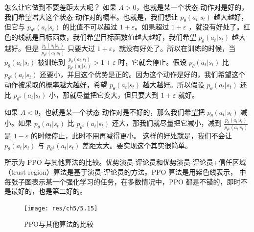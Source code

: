 怎么让它做到不要差距太大呢？
    如果 $A > 0$，也就是某一个状态-动作对是好的，我们希望增大这个状态-动作对的概率。也就是，我们想让  $p_{\theta}(a_{t} | s_{t})$ 越大越好，但它与 $p_{\theta^k}(a_{t} | s_{t})$ 的比值不可以超过 $1+\varepsilon$。如果超过 $1+\varepsilon$  ，就没有好处了。红色的线就是目标函数，我们希望目标函数值越大越好，我们希望 $p_{\theta}(a_{t} | s_{t})$ 越大越好。但是 $\frac{p_{\theta}\left(a_{t} | s_{t}\right)}{p_{\theta^{k}}\left(a_{t} | s_{t}\right)}$ 只要大过 $1+\varepsilon$，就没有好处了。所以在训练的时候，当 $p_{\theta}(a_{t} | s_{t})$ 被训练到 $\frac{p_{\theta}\left(a_{t} | s_{t}\right)}{p_{\theta^{k}}\left(a_{t} | s_{t}\right)}>1+\varepsilon$ 时，它就会停止。假设 $p_{\theta}(a_{t} | s_{t})$  比 $p_{\theta^k}(a_{t} | s_{t})$ 还要小，并且这个优势是正的。因为这个动作是好的，我们希望这个动作被采取的概率越大越好，希望 $p_{\theta}(a_{t} | s_{t})$ 越大越好。所以假设 $p_{\theta}(a_{t} | s_{t})$ 还比 $p_{\theta^k}(a_{t} | s_{t})$  小，那就尽量把它变大，但只要大到 $1+\varepsilon$ 就好。

    如果 $A < 0$，也就是某一个状态-动作对是不好的，那么我们希望把 $p_{\theta}(a_{t} | s_{t})$ 减小。如果 $p_{\theta}(a_{t} | s_{t})$ 比 $p_{\theta^k}(a_{t} | s_{t})$  还大，那我们就尽量把它减小，减到 $\frac{p_{\theta}\left(a_{t} | s_{t}\right)}{p_{\theta^{k}}\left(a_{t} | s_{t}\right)}$ 是 $1-\varepsilon$ 的时候停止，此时不用再减得更小。
这样的好处就是，我们不会让 $p_{\theta}(a_{t} | s_{t})$ 与 $p_{\theta^k}(a_{t} | s_{t})$ 差距太大。要实现这个其实很简单。


 所示为 PPO 与其他算法的比较。优势演员-评论员和优势演员-评论员+信任区域（trust region）算法是基于演员-评论员的方法。PPO 算法是用紫色线表示， 中每张子图表示某一个强化学习的任务，在多数情况中，PPO 都是不错的，即时不是最好的，也是第二好的。

\begin{figure}[h]
    \centering
    \texttt{[image: res/ch5/5.15]}
    \caption{PPO与其他算法的比较}
    \label{fig:fig5.15}
\end{figure}









